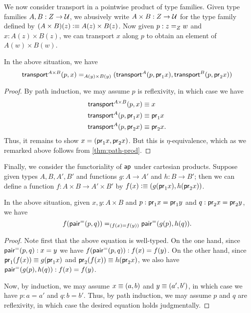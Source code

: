 We now consider transport in a pointwise product of type families.
Given type families $ A, B : Z \to \type$, we abusively write $A\times B:Z\to \type$ for the type family defined by $(A\times B)(z) \defeq A(z) \times B(z)$.
Now given $p : \id[Z]{z}{w}$ and $x : A(z) \times B(z)$, we can transport $x$ along $p$ to obtain an element of $A(w)\times B(w)$.

\begin{thm}\label{thm:trans-prod}
  In the above situation, we have
  \[
  \id[A(y) \times B(y)]
  {\transfib{A\times B}px}
  {(\transfib{A}{p}{\proj{1}x}, \transfib{B}{p}{\proj{2}x})}
  \]
\end{thm}
\begin{proof}
  By path induction, we may assume $p$ is reflexivity, in which case we have
  \begin{align*}
    \transfib{A\times B}px&\jdeq x\\
    \transfib{A}{p}{\proj{1}x}&\jdeq \proj1x\\
    \transfib{A}{p}{\proj{2}x}&\jdeq \proj2x.
  \end{align*}
  Thus, it remains to show $x = (\proj1 x, \proj2x)$.
  But this is $\eta$-equivalence, which as we remarked above follows from \autoref{thm:path-prod}.
\end{proof}

Finally, we consider the functoriality of $\apfunc{}$ under cartesian products.
Suppose given types $A,B,A',B'$ and functions $g:A\to A'$ and $h:B\to B'$; then we can define a function $f:A\times B\to A'\times B'$ by $f(x) \defeq (g(\proj1x),h(\proj2x))$.

\begin{thm}\label{thm:ap-prod}
  In the above situation, given $x,y:A\times B$ and $p:\proj1x=\proj1y$ and $q:\proj2x=\proj2y$, we have
  \[ \id[(f(x)=f(y))]{\ap{f}{\pairpath(p,q)}} {\pairpath(\ap{g}{p},\ap{h}{q})}. \]
\end{thm}
\begin{proof}
  Note first that the above equation is well-typed.
  On the one hand, since $\pairpath(p,q):x=y$ we have $\ap{f}{\pairpath(p,q)}:f(x)=f(y)$.
  On the other hand, since $\proj1(f(x))\jdeq g(\proj1x)$ and $\proj2(f(x))\jdeq h(\proj2x)$, we also have $\pairpath(\ap{g}{p},\ap{h}{q}):f(x)=f(y)$.

  Now, by induction, we may assume $x\jdeq(a,b)$ and $y\jdeq(a',b')$, in which case we have $p:a=a'$ and $q:b=b'$.
  Thus, by path induction, we may assume $p$ and $q$ are reflexivity, in which case the desired equation holds judgmentally.
\end{proof}

